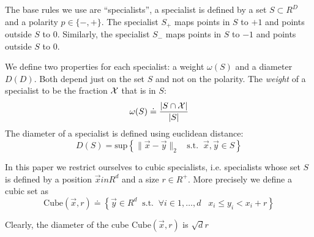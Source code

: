 \documentclass{article}
\newcommand{\X}{{\cal X}}
\newcommand{\x}{\vec{x}}
\newcommand{\y}{\vec{y}}
\newcommand{\polarity}{p}
\newcommand{\diameter}{D}
\newcommand{\weight}{\omega}
\begin{document}
The base rules we use are ``specialists'', a specialist is defined by
a set $S \subset R^D$ and a polarity $\polarity \in \{-,+\}$. The
specialist $S_+$ maps points in $S$ to $+1$ and points outside $S$ to
$0$. Similarly, the specialist $S_-$ maps points in $S$ to $-1$ and
points outside $S$ to $0$.

We define two properties for each specialist: a weight $\weight(S)$
and a diameter $\diameter(D)$. Both depend just on the set $S$ and not
on the polarity. The {\em weight} of a specialist to be the fraction $\X$
that is in $S$:
\[
\weight(S) \doteq \frac{|S \cap \X|}{|S|}
\]
The diameter of a specialist is defined using euclidean distance:
\[
\diameter(S) = \text{sup} \left\{ \|\x-\y \|_2 \;\;\text{ s.t.}\;\;   \x,\y
\in S \right\}
\]

In this paper we restrict ourselves to cubic specialists,
i.e. specialists whose set $S$ is defined by a position $\x in R^d$
and a size $r \in R^+$. More precisely we define a cubic set as
\[
\text{Cube}\left(\x,r\right) \doteq
\left\{\y \in R^d\;\; \text{s.t.}\;\; \forall i \in 1,\ldots,d\;\;\; x_i
\leq y_i < x_i+r   \right\}
\]

Clearly, the diameter of the cube $\text{Cube}(\x,r)$ is $\sqrt{d} r$
\end{document}
